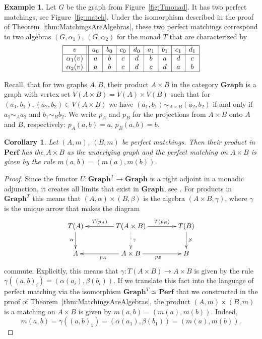 \documentclass[reqno,A4paper]{amsart}
\newcommand{\Graph}{\mathbf{Graph}}
\newcommand{\Perf}{\mathbf{Perf}}
\newtheorem{corollary}[theorem]{Corollary}
\theoremstyle{definition}
\newtheorem{example}[theorem]{Example}
\numberwithin{equation}{section}
\begin{document}
\begin{example}
Let $G$ be the graph from Figure~\ref{fig:Tmonad}. It
has two perfect matchings, see Figure~\ref{fig:match}.
Under the isomorphism described in the proof of Theorem~\ref{thm:MatchingsAreAlgebras},
these two perfect matchings correspond to two algebras $(G,\alpha_1)$, $(G,\alpha_2)$
for the monad $T$ that are characterized by
$$
\begin{array}{|c||c|c|c|c|c|c|c|c|}
\hline
v & a_0 & b_0 & c_0 & d_0& a_1 & b_1 & c_1 & d_1\\
\hline
\alpha_1(v) &a &b &c &d & b & a & d & c \\
\alpha_2(v) &a &b &c &d & c & d & a & b \\
\hline
\end{array}
$$
\end{example}

Recall, that for two graphs $A,B$, their product $A\times B$
in the category $\Graph$ is a graph with vertex set $V(A\times B)=V(A)\times V(B)$ such that
for $(a_1,b_1),(a_2,b_2)\in V(A\times B)$ we have $(a_1,b_1)\sim_{A\times B}(a_2,b_2)$
if and only if $a_1\sim_A a_2$ and $b_1\sim_B b_2$. We write $p_A$ and $p_B$ for the
projections from $A\times B$ onto $A$ and $B$, respectively: $p_A(a,b)=a$, $p_B(a,b)=b$.

\begin{corollary}
Let $(A,m)$, $(B,m)$ be perfect matchings. Then their product
in $\Perf$ has the $A\times B$ as the underlying graph and the perfect matching on
$A\times B$ is given by the rule $m(a,b)=(m(a),m(b))$.
\end{corollary}
\begin{proof}
Since the functor $U:\Graph^T\to\Graph$ is a right adjoint in a
monadic adjunction, it creates all limits that exist in $\Graph$,
see \cite[Proposition IV.4.1]{maclane2012sheaves}.  For products
in $\Graph^T$ this means that $(A,\alpha)\times(B,\beta)$ is the
algebra $(A\times B,\gamma)$, where $\gamma$ is the unique arrow that makes
the diagram
\begin{equation}
\label{diag:product}
\xymatrix@C=4em{
T(A)
	\ar[d]_{\alpha}
&
T(A\times B)
	\ar[l]_-{T(p_A)}
	\ar@{.>}[d]^{\gamma}
	\ar[r]^-{T(p_B)}
&
T(B)
	\ar[d]^{\beta}
\\
A
&
A\times B
	\ar[l]^{p_A}
	\ar[r]_{p_B}
&
B
}
\end{equation}
commute. Explicitly, this means that $\gamma:T(A\times B)\to A\times B$ is
given by the rule $\gamma((a,b)_i)=(\alpha(a_i),\beta(b_i))$. If we
translate this fact into the language
of perfect matching via the isomorphism $\Graph^T\simeq\Perf$ that we constructed in the proof
of Theorem~\ref{thm:MatchingsAreAlgebras}, 
the product $(A,m)\times(B,m)$ is a matching on $A\times B$ is given by $m(a,b)=(m(a),m(b))$.
Indeed,
$$
m(a,b)=\gamma((a,b)_1)=(\alpha(a_1),\beta(b_1))=(m(a),m(b)).
$$
\end{proof}
\end{document}
